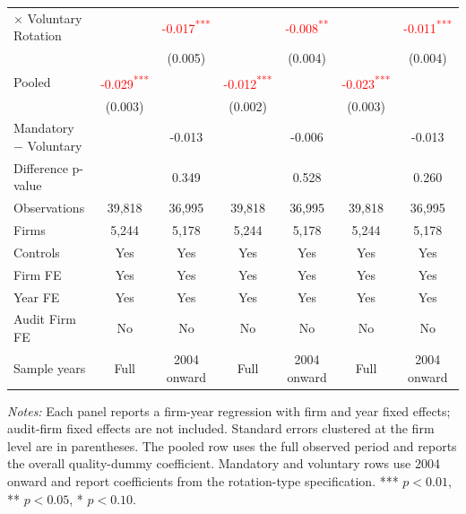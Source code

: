 \documentclass[10pt]{article}
\newcommand{\sym}[1]{\textsuperscript{#1}}
\begin{document}
\begin{minipage}{19cm}
\begin{threeparttable}
\begin{tabular}{l cc cc cc}
$\times$ Voluntary Rotation &  & \textcolor{red}{-0.017\sym{***}} &  & \textcolor{red}{-0.008\sym{**}} &  & \textcolor{red}{-0.011\sym{***}} \\
 &  & (0.005) &  & (0.004) &  & (0.004) \\
Pooled & \textcolor{red}{-0.029\sym{***}} &  & \textcolor{red}{-0.012\sym{***}} &  & \textcolor{red}{-0.023\sym{***}} &  \\
 & (0.003) &  & (0.002) &  & (0.003) &  \\
Mandatory $-$ Voluntary &  & -0.013 &  & -0.006 &  & -0.013 \\
Difference p-value &  & 0.349 &  & 0.528 &  & 0.260 \\
Observations & 39,818 & 36,995 & 39,818 & 36,995 & 39,818 & 36,995 \\
Firms & 5,244 & 5,178 & 5,244 & 5,178 & 5,244 & 5,178 \\
\midrule
Controls & Yes & Yes & Yes & Yes & Yes & Yes \\
Firm FE & Yes & Yes & Yes & Yes & Yes & Yes \\
Year FE & Yes & Yes & Yes & Yes & Yes & Yes \\
Audit Firm FE & No & No & No & No & No & No \\
Sample years & Full & 2004 onward & Full & 2004 onward & Full & 2004 onward \\
\bottomrule
\end{tabular}
\begin{tablenotes}\fontsize{9}{11}\selectfont
\item \fontsize{9}{11}\selectfont \textit{Notes:} Each panel reports a firm-year regression with firm and year fixed effects; audit-firm fixed effects are not included. Standard errors clustered at the firm level are in parentheses. The pooled row uses the full observed period and reports the overall quality-dummy coefficient. Mandatory and voluntary rows use 2004 onward and report coefficients from the rotation-type specification. *** \(p<0.01\), ** \(p<0.05\), * \(p<0.10\).
\end{tablenotes}
\end{threeparttable}

\end{minipage}
\end{document}
